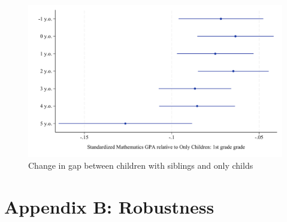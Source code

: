\begin{figure}[htbp]
    \centering
    \includegraphics[width=\textwidth]{./FIGURES/TWFE/twfe_age_youngest_g1_gpa_m_adj_Tsiblings_2_Soldest_4.pdf}
        \caption{Change in gap between children with siblings and only childs}
        \label{fig:fig_by_age_youngest}

\end{figure}




\newpage















\clearpage

\setcounter{figure}{0}
\renewcommand\thefigure{B.\arabic{figure}}    

\setcounter{table}{0}
\renewcommand{\thetable}{B.\arabic{table}}
\setcounter{subsection}{0}

\section*{Appendix B: Robustness} \label{sec:appB}


